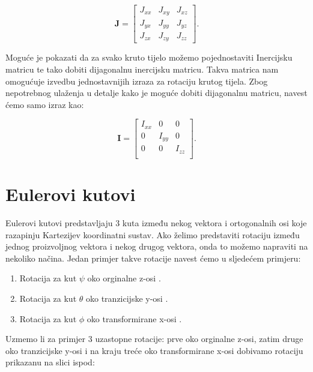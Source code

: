 \documentclass[times, utf8, diplomski, numeric]{templates/template}
\begin{document}
{{        \begin{equation}
        \boldsymbol{J} = 
        \begin{bmatrix}
            J_{xx} & J_{xy} & J_{xz} \\
            J_{yx} & J_{yy} & J_{yz} \\
            J_{zx} & J_{zy} & J_{zz}
        \end{bmatrix}
        .
        \end{equation}

        Moguće je pokazati da za svako kruto tijelo možemo pojednostaviti Inercijsku matricu te tako dobiti dijagonalnu inercijsku matricu. Takva matrica nam omogućuje izvedbu jednostavnijih izraza za rotaciju krutog tijela. Zbog nepotrebnog ulaženja u detalje kako je moguće dobiti dijagonalnu matricu, navest ćemo samo izraz kao:

        \begin{equation}
        \boldsymbol{I} = 
        \begin{bmatrix}
            I_{xx} & 0      & 0 \\
            0      & I_{yy} & 0 \\
            0      & 0      & I_{zz} \\
        \end{bmatrix}
        .
        \end{equation}
    }

    \section{Eulerovi kutovi}{
        Eulerovi kutovi predstavljaju 3 kuta između nekog vektora i ortogonalnih osi koje razapinju Kartezijev koordinatni sustav. Ako želimo predstaviti rotaciju između jednog proizvoljnog vektora i nekog drugog vektora, onda to možemo napraviti na nekoliko načina. Jedan primjer takve rotacije navest ćemo u sljedećem primjeru:

        \begin{enumerate}
            \item Rotacija za kut $\psi$ oko orginalne z-osi .
            \item Rotacija za kut $\theta$ oko tranzicijske y-osi .
            \item Rotacija za kut $\phi$ oko transformirane x-osi .
        \end{enumerate}

        Uzmemo li za primjer 3 uzastopne rotacije: prve oko orginalne z-osi, zatim druge oko tranzicijske y-osi i na kraju treće oko transformirane x-osi dobivamo rotaciju prikazanu na slici ispod: 

}}
\end{document}
